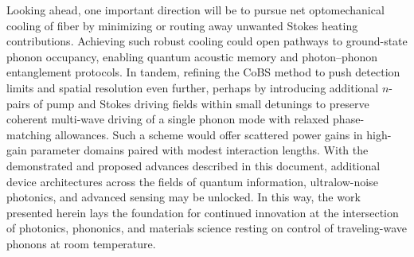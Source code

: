Looking ahead, one important direction will be to pursue net optomechanical cooling of fiber by minimizing or routing away unwanted Stokes heating contributions. Achieving such robust cooling could open pathways to ground-state phonon occupancy, enabling quantum acoustic memory and photon–phonon entanglement protocols. In tandem, refining the CoBS method to push detection limits and spatial resolution even further, perhaps by introducing additional \(n\)-pairs of pump and Stokes driving fields within small detunings to preserve coherent multi-wave driving of a single phonon mode with relaxed phase-matching allowances. Such a scheme would offer scattered power gains in high-gain parameter domains paired with modest interaction lengths. With the demonstrated and proposed advances described in this document, additional device architectures across the fields of quantum information, ultralow-noise photonics, and advanced sensing may be unlocked. In this way, the work presented herein lays the foundation for continued innovation at the intersection of photonics, phononics, and materials science resting on control of traveling-wave phonons at room temperature.

\clearpage
\thispagestyle{empty}
\null
\newpage
